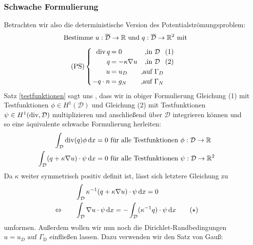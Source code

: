 \subsubsection{Schwache Formulierung}
Betrachten wir also die deterministische Version des Potentialströmungsproblem:
\[ \text{Bestimme } u:\overline{\mathcal{D}} \to \R \text{ und } q: \overline{\mathcal{D}} \to \R^2 \text{ mit } \newline \]
\[\setlength\arraycolsep{1pt}
\text{(PS)}\begin{cases} 
\begin{array}{rlcr}
\dive q     &= 0                 &\text{ ,} \text{in } \mathcal{D} &(1)\\
q           &= - \kappa \nabla u &\text{ ,} \text{in }\mathcal{D} &(2)\\
u           &= u_D               &\text{ ,} \text{auf } \Gamma_D \\
-q \cdot n  &= g_N               &\text{ ,} \text{auf } \Gamma_N 
\end{array}
\end{cases} 
\]
Satz \ref{testfunktionen} sagt uns , dass wir in obiger Formulierung Gleichung (1) mit Testfunktionen $\phi \in H^1(\mathcal{D})$ und Gleichung (2) mit Testfunktionen $\psi \in H^1(\operatorname{div},\mathcal{D})$ multiplizieren und anschließend über $\mathcal{D}$ integrieren können und so eine äquivalente schwache Formulierung herleiten:
\begin{align*}
	\int_{\mathcal{D}} \operatorname{div}(q) \phi \, \mathrm{d} x &= 0 \text{ für alle Testfunktionen } \phi : \mathcal{D} \to \mathbb{R} \\
	\int_{\mathcal{D}} (q + \kappa \nabla u) \cdot \psi \, \mathrm{d} x &= 0 \text{ für alle Testfunktionen } \psi : \mathcal{D} \to \mathbb{R}^2
\end{align*}
Da $\kappa$ weiter symmetrisch positiv definit ist, lässt sich letztere Gleichung zu 
\begin{align*}
	&\int_{\mathcal{D}} \kappa^{-1} (q + \kappa \nabla u) \cdot \psi \, \mathrm{d} x = 0 \\
	\Leftrightarrow \qquad &\int_{\mathcal{D}} \nabla u \cdot \psi \, \mathrm{d} x = - \int_{\mathcal{D}} (\kappa^{-1}q)\cdot \psi \, \mathrm{d} x \qquad (\star) 
\end{align*}
umformen. Außerdem wollen wir nun noch die Dirichlet-Randbedingungen $u = u_D \text{ auf } \Gamma_{\text{D}}$ einfließen lassen. Dazu verwenden wir den Satz von Gauß:


